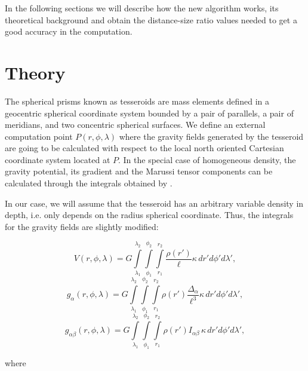 \documentclass[extra]{gji}
\begin{document}
In the following sections we will describe how the new algorithm works, its theoretical background and obtain the distance-size ratio values needed to get a good accuracy in the computation.


\section{Theory}

The spherical prisms known as tesseroids are mass elements defined in a geocentric spherical coordinate system bounded by a pair of parallels, a pair of  meridians, and two concentric spherical surfaces.
We define an external computation point $P(r, \phi, \lambda)$ where the gravity fields generated by the tesseroid are going to be calculated with respect to the local north oriented Cartesian coordinate system located at $P$.
In the special case of homogeneous density, the gravity potential, its gradient and the Marussi tensor components can be calculated through the integrals obtained by \citet{Grombein2013} \citep[see also][]{Uieda2016}.

In our case, we will assume that the tesseroid has an arbitrary variable density in depth, i.e. only depends on the radius spherical coordinate.
Thus, the integrals for the gravity fields are slightly modified:

\begin{equation}
    V(r,\phi,\lambda) = G
    \int\limits_{\lambda_1}^{\lambda_2}
    \int\limits_{\phi_1}^{\phi_2}
    \int\limits_{r_1}^{r_2}
    \frac{\rho(r')}{\ell} \kappa \,  dr' d\phi' d\lambda',
\label{eq:tesseroid-pot}
\end{equation}
\begin{equation}
    g_{\alpha}(r,\phi,\lambda) = G
    \int\limits_{\lambda_1}^{\lambda_2}
    \int\limits_{\phi_1}^{\phi_2}
    \int\limits_{r_1}^{r_2}
    \rho(r') \frac{\Delta_\alpha}{\ell^3}
    \kappa \, dr' d\phi' d\lambda',
\label{eq:tesseroid-grav}
\end{equation}
\begin{equation}
    g_{\alpha\beta}(r,\phi,\lambda) = G
    \int\limits_{\lambda_1}^{\lambda_2}
    \int\limits_{\phi_1}^{\phi_2}
    \int\limits_{r_1}^{r_2}
    \rho(r') I_{\alpha\beta} \, \kappa \, dr' d\phi' d\lambda' ,
    \label{eq:tesseroid-tensor}
\end{equation}

\noindent where
\end{document}
